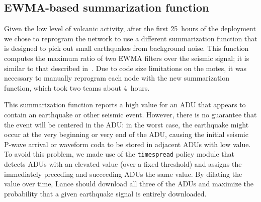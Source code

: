 



\subsection{EWMA-based summarization function}
\label{sec-ewma-deployment}

Given the low level of volcanic activity, after the first 25~hours of
the deployment we chose to reprogram the network to use a different
summarization function that is designed to pick out small earthquakes
from background noise. This function computes the maximum ratio of two
EWMA filters over the seismic signal; it is similar to that described
in~\cite{volcano-osdi06}. Due to code size limitations on
the motes, it was necessary to manually reprogram each node with the
new summarization function, which took two teams about 4~hours.


This summarization function reports a high value for an ADU
that appears to contain an earthquake or other seismic event. 
However, there is no guarantee that the event will be centered in the
ADU: in the worst case, the earthquake might occur at the very
beginning or very end of the ADU, causing the initial seismic P-wave arrival
or waveform coda to be stored in adjacent ADUs with low value.
To avoid this problem, we made use of the {\tt timespread} policy
module that detects ADUs with
an elevated value (over a fixed threshold) and assigns the
immediately preceding and succeeding ADUs the same value.
By dilating the value over time, Lance should download
all three of the ADUs and maximize the probability that a given
earthquake signal is entirely downloaded.

